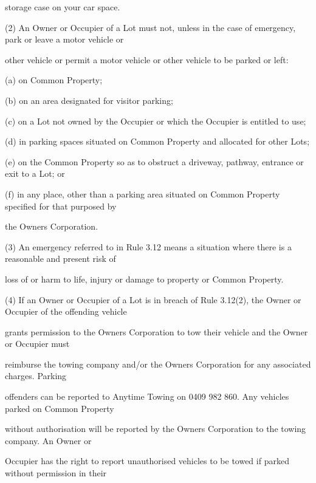 \documentclass{article}
\begin{document}
{\fontsize{10.02}{1}storage case on your car space. }

{\fontsize{9.962}{1}(2) An Owner or Occupier of a Lot must not, unless in the case of emergency, park or leave a motor vehicle or }

{\fontsize{10.02}{1}other vehicle or permit a motor vehicle or other vehicle to be parked or left: }

{\fontsize{9.962}{1}(a) on Common Property; }

{\fontsize{9.962}{1}(b) on an area designated for visitor parking; }

{\fontsize{9.962}{1}(c) on a Lot not owned by the Occupier or which the Occupier is entitled to use; }

{\fontsize{9.962}{1}(d) in parking spaces situated on Common Property and allocated for other Lots; }

{\fontsize{9.962}{1}(e) on the Common Property so as to obstruct a driveway, pathway, entrance or exit to a Lot; or }

{\fontsize{9.962}{1}(f) in any place, other than a parking area situated on Common Property specified for that purposed by }

{\fontsize{10.02}{1}the Owners Corporation. }

{\fontsize{9.962}{1}(3) An emergency referred to in Rule 3.12 means a situation where there is a reasonable and present risk of }

{\fontsize{10.02}{1}loss of or harm to life, injury or damage to property or Common Property. }

{\fontsize{9.962}{1}(4) If an Owner or Occupier of a Lot is in breach of Rule 3.12(2), the Owner or Occupier of the offending vehicle }

{\fontsize{10.02}{1}grants permission to the Owners Corporation to tow their vehicle and the Owner or Occupier must }

{\fontsize{10.02}{1}reimburse the towing company and/or the Owners Corporation for any associated charges. Parking }

{\fontsize{10.02}{1}offenders can be reported to Anytime Towing on 0409 982 860. Any vehicles parked on Common Property }

{\fontsize{10.02}{1}without authorisation will be reported by the Owners Corporation to the towing company. An Owner or }

{\fontsize{10.02}{1}Occupier has the right to report unauthorised vehicles to be towed if parked without permission in their }
\end{document}
